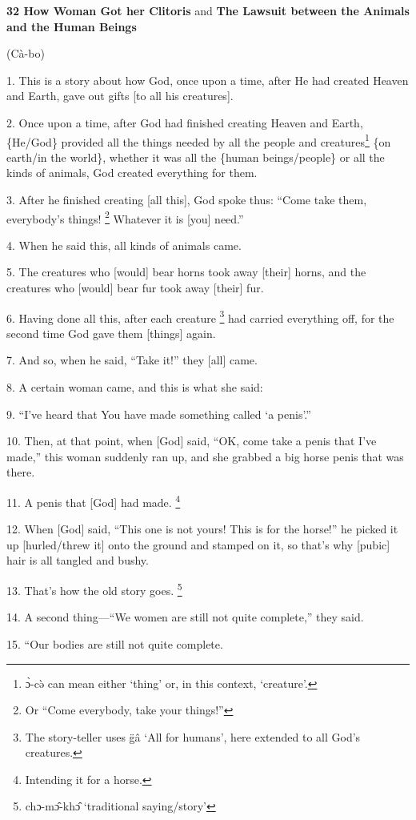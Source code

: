 
\textbf{32 How Woman Got her Clitoris} and \textbf{The Lawsuit between the Animals
and the Human Beings}

(Cà-bo)

1. This is a story about how God, once upon a time, after He had created Heaven
and Earth, gave out gifts [to all his creatures].

2. Once upon a time, after God had finished creating Heaven and Earth, \{He/God\}
provided all the things needed by all the people and creatures\footnote{ɔ̀-cə̀ can mean either `thing' or, in this context, `creature'.} \{on earth/in
the world\}, whether it was all the \{human beings/people\} or all the kinds of
animals, God created everything for them.

3. After he finished creating [all this], God spoke thus: ``Come take them, everybody's
things! \footnote{Or ``Come everybody, take your things!''}  Whatever it is [you] need.''

4. When he said this, all kinds of animals came.

5. The creatures who [would] bear horns took away [their] horns, and the creatures
who [would] bear fur took away [their] fur.

6. Having done all this, after each creature \footnote{The story-teller uses g̈â `All for humans', here extended to all God's creatures.} had carried everything off, for
the second time God gave them [things] again.

7. And so, when he said, ``Take it!'' they [all] came.

8. A certain woman came, and this is what she said:

9. ``I've heard that You have made something called `a penis'.''

10. Then, at that point, when [God] said, ``OK, come take a penis that I've made,''
this woman suddenly ran up, and she grabbed a big horse penis that was there.

11. A penis that [God] had made. \footnote{Intending it for a horse.}

12. When [God] said, ``This one is not yours! This is for the horse!'' he picked
it up [hurled/threw it] onto the ground and stamped on it, so that's why [pubic]
hair is all tangled and bushy.

13. That's how the old story goes. \footnote{chɔ-mɔ̂-khɔ̂ `traditional saying/story'}

14. A second thing---``We women are still not quite complete,'' they said.

15. ``Our bodies are still not quite complete.


